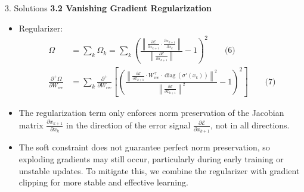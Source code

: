 \documentclass[final]{beamer}
\begin{document}
\begin{frame}[t]
\begin{columns}[t,totalwidth=\textwidth]
\begin{column}{0.3\textwidth}
\begin{block}{3. Solutions }
    \textbf{3.2 Vanishing Gradient Regularization}
      \begin{itemize}
        \item \justifying Regularizer: 
            \begin{align*}
            \Omega &= \sum_k \Omega_k 
            = \sum_k \left(  
            \frac{ \left\| \frac{\partial \mathcal{E}}{\partial x_{k+1}} 
            \cdot \frac{\partial x_{k+1}}{\partial x_k} \right\| }
            { \left\| \frac{\partial \mathcal{E}}{\partial x_{k+1}} \right\| } - 1 
            \right)^2 \hspace{2em} \text{(6)} \\[1em]
            \frac{\partial^+ \Omega}{\partial W_{\text{rec}}} &= \sum_k 
            \frac{\partial^+}{\partial W_{\text{rec}}} \left[
            \left( 
            \frac{ \left\| \frac{\partial \mathcal{E}}{\partial x_{k+1}} 
            \cdot W_{\text{rec}}^\top 
            \cdot \operatorname{diag}\left( \sigma'(x_k) \right) \right\|^2 }
            { \left\| \frac{\partial \mathcal{E}}{\partial x_{k+1}} \right\|^2 } - 1 
            \right)^2
            \right] \hspace{2em} \text{(7)}
            \end{align*}

        \item \justifying The regularization term only enforces norm preservation of the Jacobian matrix
        $\frac{\partial x_{k+1}}{\partial x_k}$ in the direction of the error signal 
        $\frac{\partial \mathcal{E}}{\partial x_{k+1}}$, not in all directions.
        
        \item \justifying The soft constraint does not guarantee perfect norm preservation, so exploding gradients may still occur, particularly during early training or unstable updates. To mitigate this, we combine the regularizer with gradient clipping for more stable and effective learning.


\end{itemize}
\end{block}
\end{column}
\end{columns}
\end{frame}
\end{document}
